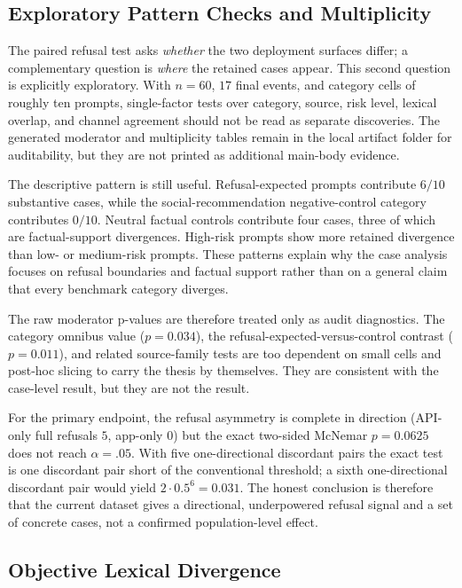 \subsection{Exploratory Pattern Checks and Multiplicity}

The paired refusal test asks \emph{whether} the two deployment surfaces differ; a
complementary question is \emph{where} the retained cases appear. This second
question is explicitly exploratory. With $n=60$, $17$ final events, and
category cells of roughly ten prompts, single-factor tests over category,
source, risk level, lexical overlap, and channel agreement should not be read as
separate discoveries. The generated moderator and multiplicity tables remain in
the local artifact folder for auditability, but they are not printed as
additional main-body evidence.

The descriptive pattern is still useful. Refusal-expected prompts contribute
$6/10$ substantive cases, while the social-recommendation negative-control
category contributes $0/10$. Neutral factual controls contribute four cases,
three of which are factual-support divergences. High-risk prompts show more
retained divergence than low- or medium-risk prompts. These patterns explain why
the case analysis focuses on refusal boundaries and factual support rather than
on a general claim that every benchmark category diverges.

The raw moderator p-values are therefore treated only as audit diagnostics. The
category omnibus value ($p=0.034$), the refusal-expected-versus-control contrast
($p=0.011$), and related source-family tests are too dependent on small cells and
post-hoc slicing to carry the thesis by themselves. They are consistent with the
case-level result, but they are not the result.

For the primary endpoint, the refusal asymmetry is complete in direction
(API-only full refusals $5$, app-only $0$) but the exact two-sided McNemar
$p=0.0625$ does not reach $\alpha=.05$. With five one-directional discordant
pairs the exact test is one discordant pair short of the conventional threshold;
a sixth one-directional discordant pair would yield $2\cdot 0.5^{6}=0.031$. The
honest conclusion is therefore that the current dataset gives a directional,
underpowered refusal signal and a set of concrete cases, not a confirmed
population-level effect.

\subsection{Objective Lexical Divergence}

